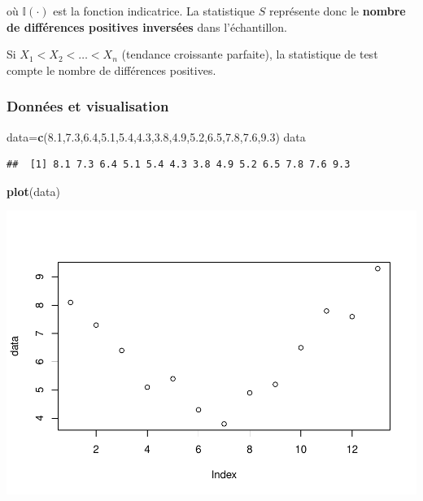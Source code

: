 \documentclass[
  12pt,
]{article}
\newenvironment{Shaded}{\begin{snugshade}}{\end{snugshade}}
\newcommand{\FloatTok}[1]{\textcolor[rgb]{0.00,0.00,0.81}{#1}}
\newcommand{\FunctionTok}[1]{\textcolor[rgb]{0.13,0.29,0.53}{\textbf{#1}}}
\newcommand{\NormalTok}[1]{#1}
\newcommand{\OtherTok}[1]{\textcolor[rgb]{0.56,0.35,0.01}{#1}}
\begin{document}
où \(\mathbb{I}(\cdot)\) est la fonction indicatrice. La statistique
\(S\) représente donc le \textbf{nombre de différences positives
inversées} dans l'échantillon.

Si \(X_1 < X_2 < \dots < X_n\) (tendance croissante parfaite), la
statistique de test compte le nombre de différences positives.

\subsubsection{Données et
visualisation}\label{donnuxe9es-et-visualisation}

\begin{Shaded}
\begin{Highlighting}[]
\NormalTok{data}\OtherTok{=}\FunctionTok{c}\NormalTok{(}\FloatTok{8.1}\NormalTok{,}\FloatTok{7.3}\NormalTok{,}\FloatTok{6.4}\NormalTok{,}\FloatTok{5.1}\NormalTok{,}\FloatTok{5.4}\NormalTok{,}\FloatTok{4.3}\NormalTok{,}\FloatTok{3.8}\NormalTok{,}\FloatTok{4.9}\NormalTok{,}\FloatTok{5.2}\NormalTok{,}\FloatTok{6.5}\NormalTok{,}\FloatTok{7.8}\NormalTok{,}\FloatTok{7.6}\NormalTok{,}\FloatTok{9.3}\NormalTok{)}
\NormalTok{data}
\end{Highlighting}
\end{Shaded}

\begin{verbatim}
##  [1] 8.1 7.3 6.4 5.1 5.4 4.3 3.8 4.9 5.2 6.5 7.8 7.6 9.3
\end{verbatim}

\begin{Shaded}
\begin{Highlighting}[]
\FunctionTok{plot}\NormalTok{(data)}
\end{Highlighting}
\end{Shaded}

\includegraphics{Stat_non_para_files/figure-latex/unnamed-chunk-30-1.pdf}
\end{document}
